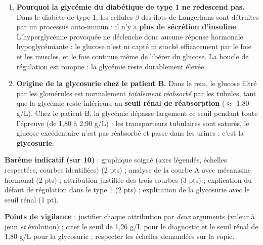 \documentclass[11pt]{article}
\begin{document}
\begin{corrige}
\begin{enumerate}
\begin{itemize}
\item \textbf{Courbe C $\to$ diabétique de type 2 sous traitement} : glycémie à jeun anormale mais modérée (1,30 g/L), élévation atténuée (pic 2,10 g/L) et descente progressive (1,50 g/L à 120 min) grâce au traitement (antidiabétiques oraux + régime), sans toutefois atteindre la normale.
\end{itemize}
\item \textbf{Pourquoi la glycémie du diabétique de type 1 ne redescend pas.} Dans le diabète de type 1, les cellules $\beta$ des îlots de Langerhans sont détruites par un processus auto-immun : il n'y a \textbf{plus de sécrétion d'insuline}. L'hyperglycémie provoquée ne déclenche donc aucune réponse hormonale hypoglycémiante : le glucose n'est ni capté ni stocké efficacement par le foie et les muscles, et le foie continue même de libérer du glucose. La boucle de régulation est rompue : la glycémie reste durablement élevée.
\item \textbf{Origine de la glycosurie chez le patient B.} Dans le rein, le glucose filtré par les glomérules est normalement \emph{totalement réabsorbé} par les tubules, tant que la glycémie reste inférieure au \textbf{seuil rénal de réabsorption} ($\approx$ 1,80 g/L). Chez le patient B, la glycémie dépasse largement ce seuil pendant toute l'épreuve (de 1,80 à 2,90 g/L) : les transporteurs tubulaires sont saturés, le glucose excédentaire n'est pas réabsorbé et passe dans les urines : c'est la \textbf{glycosurie}.
\end{enumerate}
\textbf{Barème indicatif (sur 10)} : graphique soigné (axes légendés, échelles respectées, courbes identifiées) (2 pts) ; analyse de la courbe A avec mécanisme hormonal (2 pts) ; attribution justifiée des trois courbes (3 pts) ; explication du défaut de régulation dans le type 1 (2 pts) ; explication de la glycosurie avec le seuil rénal (1 pt).

\textbf{Points de vigilance} : justifier chaque attribution par \emph{deux} arguments (valeur à jeun \emph{et} évolution) ; citer le seuil de 1,26 g/L pour le diagnostic et le seuil rénal de 1,80 g/L pour la glycosurie ; respecter les échelles demandées sur la copie.
\end{corrige}
\end{document}

